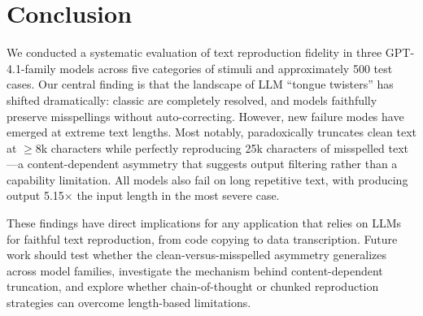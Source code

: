 \section{Conclusion}
\label{sec:conclusion}

We conducted a systematic evaluation of text reproduction fidelity in three GPT-4.1-family models across five categories of stimuli and approximately 500 test cases. Our central finding is that the landscape of LLM ``tongue twisters'' has shifted dramatically: classic \glitchtokens are completely resolved, and models faithfully preserve misspellings without auto-correcting. However, new failure modes have emerged at extreme text lengths. Most notably, \gptfull paradoxically truncates clean text at $\geq$8k characters while perfectly reproducing 25k characters of misspelled text---a content-dependent asymmetry that suggests output filtering rather than a capability limitation. All models also fail on long repetitive text, with \gptmini producing output 5.15$\times$ the input length in the most severe case.

These findings have direct implications for any application that relies on LLMs for faithful text reproduction, from code copying to data transcription. Future work should test whether the clean-versus-misspelled asymmetry generalizes across model families, investigate the mechanism behind content-dependent truncation, and explore whether chain-of-thought or chunked reproduction strategies can overcome length-based limitations.
